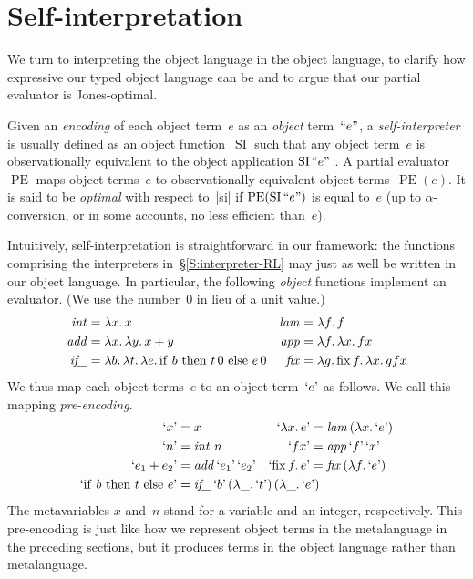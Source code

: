 \documentclass[preprint]{sigplanconf}
\newcommand{\fun}[1]{\mathopen{\lambda\mathord{#1}.\,}}
\newcommand{\fix}[1]{\mathopen{\mathrm{fix\,}\mathord{#1}.\,}}
\newcommand{\cond}[3]{\mathrm{if\ }#1\mathrm{\ then\ }#2\mathrm{\ else\ }#3}
\newcommand{\Encode}[1]{\mathinner{\mathopen{\text{``}}#1\mathclose{\text{''}}}}
\newcommand{\encode}[1]{\mathinner{\mathopen{\text{`}}#1\mathclose{\text{'}}}}
\newcommand{\ident}[1]{\mathinner{\text{\textit{#1\/}}}}
\DeclareMathOperator{\pe}{PE}
\DeclareMathOperator{\si}{SI}
\begin{document}
\section{Self-interpretation}\label{selfinterp}

We turn to interpreting the object language in the object language, to
clarify how expressive our typed object language can be and to argue that our
partial evaluator is Jones\hyp optimal.

Given an \emph{encoding} of each object term~$e$ as an \emph{object} term~$\Encode{e}$,
a \emph{self\hyp interpreter} is usually defined as an object
function~$\si$ such that any object term~$e$ is observationally
equivalent to the object application $\si\Encode{e}$
\citep{jones-partial,taha-tag,Danvy-tagging-encoding}.
A partial evaluator~$\pe$ maps object terms~$e$ to observationally
equivalent object terms~$\pe(e)$.  It is said to be
\emph{optimal} with respect to~|si| if $\pe(\si\Encode{e})$
is equal to~$e$ (up to $\alpha$\hyp conversion, or in some accounts, no
less efficient than~$e$).

Intuitively, self\hyp interpretation is straightforward in our
framework: the functions comprising the interpreters
in~\S\ref{S:interpreter-RL} may just as well be written in our object
language.  In particular, the following \emph{object} functions implement an
evaluator.  (We use the number~$0$ in lieu of a unit value.)
\begin{align*}
    \ident{int} &= \fun{x} x &
    \ident{lam} &= \fun{f} f \\
    \ident{add} &= \fun{x} \fun{y} x+y &
    \ident{app} &= \fun{f} \fun{x} fx \\
    \ident{if\_}&= \fun{b} \fun{t} \fun{e} \cond{b}{t\,0}{e\,0} &
    \ident{fix} &= \fun{g} \fix{f} \fun{x} gfx
\end{align*}
We thus map each object terms~$e$ to an object term~$\encode{e}$ as follows.
We call this mapping \emph{pre-encoding}.
\begin{align*}
    \encode{x} &= x &
    \encode{\fun{x}e} &= \ident{lam} (\fun{x} \encode{e}) \\
    \encode{n} &= \ident{int}\, n &
    \encode{fx} &= \ident{app} \encode{f} \encode{x} \\
    \encode{e_1 + e_2} &= \ident{add} \encode{e_1} \encode{e_2} &
    \encode{\fix{f}e} &= \ident{fix} (\fun{f} \encode{e}) \\
    \encode{\cond{b}{t}{e}} &= \rlap{$\ident{if\_} \encode{b}
        \left(\fun{\_}\encode{t}\right) \left(\fun{\_}\encode{e}\right)$}
\end{align*}
The metavariables $x$ and~$n$ stand for a variable and an integer,
respectively.
This pre-encoding is just like how we represent object terms in the
metalanguage in the preceding sections, but it produces
terms in the object language rather than metalanguage.
\end{document}
